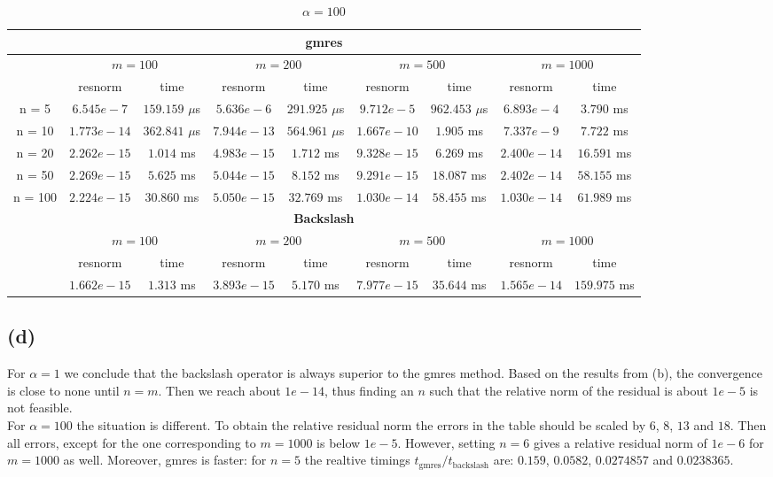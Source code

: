 \begin{table}
\centering
\small
\caption{$\alpha = 100$}
\begin{threeparttable}
{\def\arraystretch{1.3}
\begin{tabular}{ccccccccc}
  \toprule
  \multicolumn{9}{c}{\textbf{gmres}}\\
\midrule
& \multicolumn{2}{c}{$m = 100$} & \multicolumn{2}{c}{$m = 200$} & \multicolumn{2}{c}{$m = 500$} & \multicolumn{2}{c}{$m = 1000$}\\
\midrule
& resnorm & time & resnorm & time & resnorm & time & resnorm & time \\
\midrule
n = 5 & $6.545e-7$ & $159.159$ $\mu$s & $5.636e-6$ & $291.925$ $\mu$s & $9.712e-5$ & $962.453$ $\mu$s & $6.893e-4$ & $3.790$ ms\\
n = 10 & $1.773e-14$ & $362.841$ $\mu$s & $7.944e-13$ & $564.961$ $\mu$s & $1.667e-10$ & $1.905$ ms & $7.337e-9$ & $7.722$ ms\\
n = 20 & $2.262e-15$ & $1.014$ ms & $4.983e-15$ & $1.712$ ms & $9.328e-15$ & $6.269$ ms & $2.400e-14$ & $16.591$ ms\\
n = 50 & $2.269e-15$ & $5.625$ ms & $5.044e-15$ & $8.152$ ms & $9.291e-15$ & $18.087$ ms & $2.402e-14$ & $58.155$ ms\\
n = 100 & $2.224e-15$ & $30.860$ ms & $5.050e-15$ & $32.769$ ms & $1.030e-14$ & $58.455$ ms & $1.030e-14$ & $61.989$ ms\\
\bottomrule
\multicolumn{9}{c}{\textbf{Backslash}}\\
\midrule
& \multicolumn{2}{c}{$m = 100$} & \multicolumn{2}{c}{$m = 200$} & \multicolumn{2}{c}{$m = 500$} & \multicolumn{2}{c}{$m = 1000$}\\
\midrule
& resnorm & time & resnorm & time &resnorm & time & resnorm & time \\
\midrule
 & $1.662e-15$ & $1.313$ ms & $3.893e-15$ & $5.170$ ms & $7.977e-15$ & $35.644$ ms & $1.565e-14$ & $159.975$ ms\\
\bottomrule

\end{tabular}
}
\end{threeparttable}
\end{table}
\clearpage

\subsection*{(d)}
For $\alpha = 1$ we conclude that the backslash operator is always superior to the gmres method. Based on the results from (b), the convergence is close to none until $n = m$. Then we reach about $1e-14$, thus finding an $n$ such that the relative norm of the residual is about $1e-5$ is not feasible.\\

For $\alpha = 100$ the situation is different. To obtain the relative residual norm the errors in the table should be scaled by $6$, $8$, $13$ and $18$. Then all errors, except for the one corresponding to $m = 1000$ is below $1e-5$. However, setting $n = 6$ gives a relative residual norm of $1e-6$ for $m = 1000$ as well. Moreover, gmres is faster: for $n = 5$ the realtive timings $t_{\text{gmres}}/t_{\text{backslash}}$ are: $0.159$,  $0.0582$,  $0.0274857$ and  $0.0238365$.
